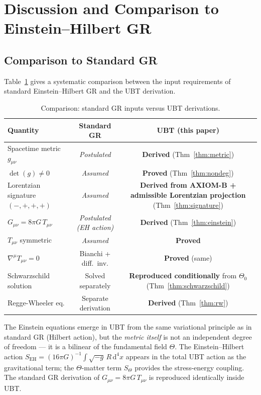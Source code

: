 \documentclass[12pt,a4paper]{article}
\theoremstyle{definition}
\theoremstyle{remark}
\begin{document}
\section{Discussion and Comparison to Einstein--Hilbert GR}
\label{sec:discussion}

\subsection{Comparison to Standard GR}

Table~\ref{tab:comparison} gives a systematic comparison between the input
requirements of standard Einstein--Hilbert GR and the UBT derivation.

\begin{table}[ht]
\centering
\caption{Comparison: standard GR inputs versus UBT derivations.}
\label{tab:comparison}
\begin{tabular}{lcc}
\toprule
\textbf{Quantity} & \textbf{Standard GR} & \textbf{UBT (this paper)} \\
\midrule
Spacetime metric $g_{\mu\nu}$ & \emph{Postulated} & \textbf{Derived} (Thm~\ref{thm:metric}) \\
$\det(g) \neq 0$ & \emph{Assumed} & \textbf{Proved} (Thm~\ref{thm:nondeg}) \\
Lorentzian signature $(-,+,+,+)$ & \emph{Assumed} & \textbf{Derived from AXIOM-B + admissible Lorentzian projection} (Thm~\ref{thm:signature}) \\
$G_{\mu\nu} = 8\pi G\,T_{\mu\nu}$ & \emph{Postulated (EH action)} & \textbf{Derived} (Thm~\ref{thm:einstein}) \\
$T_{\mu\nu}$ symmetric & \emph{Assumed} & \textbf{Proved} \\
$\nabla^\mu T_{\mu\nu} = 0$ & Bianchi + diff.\ inv. & \textbf{Proved} (same) \\
Schwarzschild solution & Solved separately & \textbf{Reproduced conditionally} from $\Theta_0$ (Thm~\ref{thm:schwarzschild}) \\
Regge-Wheeler eq. & Separate derivation & \textbf{Derived} (Thm~\ref{thm:rw}) \\
\bottomrule
\end{tabular}
\end{table}

The Einstein equations emerge in UBT from the same variational principle as
in standard GR (Hilbert action), but the \emph{metric itself} is not an
independent degree of freedom --- it is a bilinear of the fundamental field
$\Theta$.
The Einstein--Hilbert action $S_{\mathrm{EH}} = (16\pi G)^{-1}\int\!\sqrt{-g}\,R\,\mathrm{d}^4x$
appears in the total UBT action as the gravitational term; the $\Theta$-matter
term $S_\Theta$ provides the stress-energy coupling.
The standard GR derivation of $G_{\mu\nu} = 8\pi G\,T_{\mu\nu}$ is
reproduced identically inside UBT.
\end{document}
